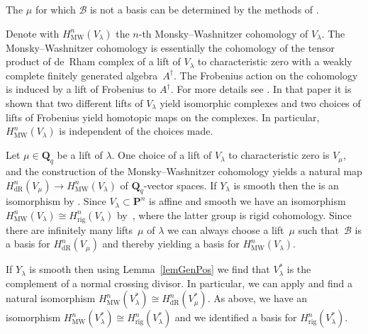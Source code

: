 \documentclass[11pt]{article}
\numberwithin{equation}{section}
\DeclareMathOperator{\rig}{rig}
\DeclareMathOperator{\dR}{dR}
\DeclareMathOperator{\MW}{MW}
\begin{document}
\begin{Remark} The $\mu$ for which $\mathcal{B}$ is not a basis can be determined by the methods of \cite[Section~3]{PanTui}.
\end{Remark}

\begin{Remark}Denote with $H^n_{\MW}(V_{\lambda})$ the $n$-th Monsky--Washnitzer cohomology of $V_\lambda$. The Monsky--Washnitzer cohomology is essentially the cohomology of the tensor product of de~Rham complex of a lift of $V_{\lambda}$ to characteristic zero with a weakly complete f\/initely generated algebra~$A^{\dagger}$. The Frobenius action on the cohomology is induced by a lift of Frobenius to $A^{\dagger}$. For more details see \cite[Theorem~2.4.5]{PutMW}. In that paper it is shown that two dif\/ferent lifts of $V_{\lambda}$ yield isomorphic complexes and two choices of lifts of Frobenius yield homotopic maps on the complexes. In particular, $H^n_{\MW}(V_\lambda)$ is independent of the choices made.

Let $\mu\in \mathbf{Q}_q$ be a lift of $\lambda$. One choice of a lift of $V_\lambda$ to characteristic zero is $V_{\mu}$, and the construction of the Monsky--Washnitzer cohomology yields a natural map $H^n_{\dR}(V_\mu)\to H^n_{\MW}(V_\lambda)$ of $\mathbf{Q}_q$-vector spaces. If $Y_\lambda$ is smooth then the is an isomorphism by \cite{BalChi}. Since $V_\lambda \subset \mathbf{P}^n$ is af\/f\/ine and smooth we have an isomorphism $H^n_{\MW}(V_\lambda)\cong H^n_{\rig}(V_\lambda)$ by~\cite{BerSMF}, where the latter group is rigid cohomology. Since there are inf\/initely many lifts~$\mu$ of $\lambda$ we can always choose a lift~$\mu$ such that~$\mathcal{B}$ is a basis for $H^n_{\dR}(V_\mu)$ and thereby yielding a basis for $H^n_{\MW}(V_{\lambda})$.

If $Y_\lambda$ is smooth then using Lemma~\ref{lemGenPos} we f\/ind that $V_\lambda^*$ is the complement of a normal crossing divisor. In particular, we can apply \cite{BalChi} and f\/ind a natural isomorphism $H^n_{\MW}(V_\lambda^*)\cong H^n_{\dR}(V_\mu^*)$. As above, we have an isomorphism $H^n_{\MW}(V_\lambda^*)\cong H^n_{\rig}(V_\lambda^*)$ and we identif\/ied a basis for $H^n_{\rig}(V_\lambda^*)$.
\end{Remark}
\end{document}
